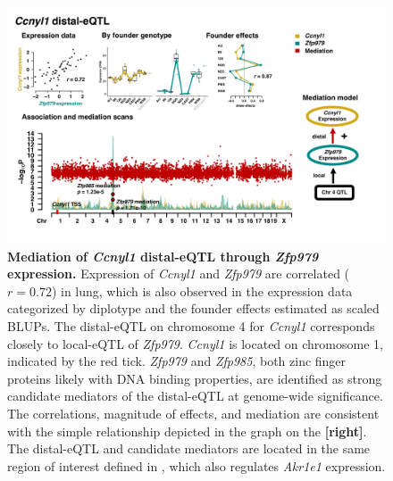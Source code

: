 \documentclass[9pt,twocolumn,twoside]{gsajnl}
\begin{document}
\begin{figure}[hp]
\renewcommand{\familydefault}{\sfdefault}\normalfont
\centering
\includegraphics[width=\textwidth, trim={0in 0.5in 0in 0in}, clip]{figs/ccnyl1_mediation.pdf}
\caption{\textbf{Mediation of \textit{Ccnyl1} distal-eQTL through \textit{Zfp979} expression.} Expression of \textit{Ccnyl1} and \textit{Zfp979} are correlated ($r = 0.72$) in lung, which is also observed in the expression data categorized by diplotype and the founder effects estimated as scaled BLUPs. The distal-eQTL on chromosome 4 for \textit{Ccnyl1} corresponds closely to local-eQTL of \textit{Zfp979}. \textit{Ccnyl1} is located on chromosome 1, indicated by the red tick. \textit{Zfp979} and \textit{Zfp985}, both zinc finger proteins likely with DNA binding properties, are identified as strong candidate mediators of the distal-eQTL at genome-wide significance. The correlations, magnitude of effects, and mediation are consistent with the simple relationship depicted in the graph on the \textbf{[right]}. The distal-eQTL and candidate mediators are located in the same region of interest defined in \cite{HamiltonWilliams2013}, which also regulates \textit{Akr1e1} expression. 
\label{fig:ccnyl1_exmediation}}
\end{figure}

\clearpage
\end{document}
